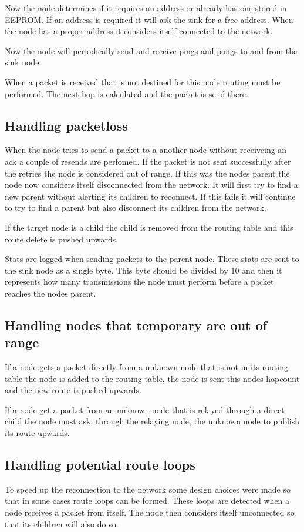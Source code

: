 \documentclass[a4paper,11pt]{article}
\begin{document}
Now the node determines if it requires an address or already has one
stored in EEPROM. If an address is required it will ask the sink for a
free address. When the node has a proper address it considers itself
connected to the network.

Now the node will periodically send and receive pings and pongs to and
from the sink node.

When a packet is received that is not destined for this node routing
must be performed. The next hop is calculated and the packet is send
there.

\subsection{Handling packetloss}
When the node tries to send a packet to a another node without
receiveing an ack a couple of resends are perfomed. If the packet is
not sent successfully after the retries the node is considered out of
range. If this was the nodes parent the node now considers itself
disconnected from the network. It will first try to find a new parent
without alerting its children to reconnect. If this fails it will
continue to try to find a parent but also disconnect its children from
the network.

If the target node is a child the child is removed from the routing
table and this route delete is pushed upwards.

Stats are logged when sending packets to the parent node. These stats
are sent to the sink node as a single byte. This byte should be
divided by 10 and then it represents how many transmissions the node
must perform before a packet reaches the nodes parent.

\subsection{Handling nodes that temporary are out of range}
If a node gets a packet directly from a unknown node that is not in
its routing table the node is added to the routing table, the node is
sent this nodes hopcount and the new route is pushed upwards.

If a node get a packet from an unknown node that is relayed through a
direct child the node must ask, through the relaying node, the unknown
node to publish its route upwards.

\subsection{Handling potential route loops}
To speed up the reconnection to the network some design choices were
made so that in some cases route loops can be formed. These loops are
detected when a node receives a packet from itself. The node then
considers itself unconnected so that its children will also do so.
\end{document}
